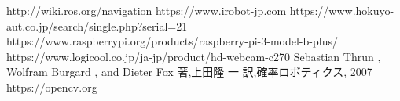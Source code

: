 \documentclass{jarticle}
\begin{document}
\begin{thebibliography}{99}\scriptsize
	 http://wiki.ros.org/navigation
	 https://www.irobot-jp.com
	 https://www.hokuyo-aut.co.jp/search/single.php?serial=21
	 https://www.raspberrypi.org/products/raspberry-pi-3-model-b-plus/
	 https://www.logicool.co.jp/ja-jp/product/hd-webcam-c270
	 Sebastian Thrun , Wolfram Burgard , and Dieter Fox 著,上田隆	一 訳,確率ロボティクス, 2007
	 https://opencv.org
\end{thebibliography}
\end{document}
